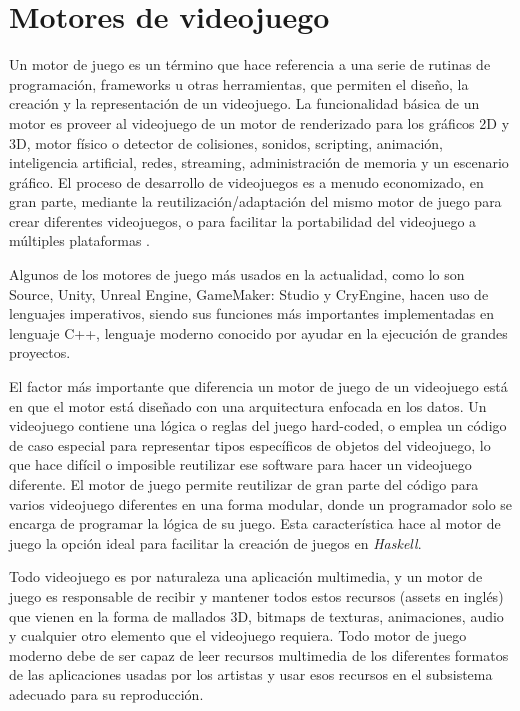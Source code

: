 
\section{Motores de videojuego}  %

\ifpdf
    \graphicspath{{motorJuego/Figs/Raster/}{motorJuego/Figs/PDF/}{motorJuego/Figs/}}
\else
    \graphicspath{{motorJuego/Figs/Vector/}{motorJuego/Figs/}}
\fi

Un motor de juego es un término que hace referencia a una serie de rutinas de programación, frameworks u otras herramientas, que permiten el diseño, la creación y la representación de un videojuego. La funcionalidad básica de un motor es proveer al videojuego de un motor de renderizado para los gráficos 2D y 3D, motor físico o detector de colisiones, sonidos, scripting, animación, inteligencia artificial, redes, streaming, administración de memoria y un escenario gráfico. El proceso de desarrollo de videojuegos es a menudo economizado, en gran parte, mediante la reutilización/adaptación del mismo motor de juego para crear diferentes videojuegos, o para facilitar la portabilidad del videojuego a múltiples plataformas \cite{JasonGregory-GameEngineArchitecture}.

Algunos de los motores de juego más usados en la actualidad, como lo son Source, Unity, Unreal Engine, GameMaker: Studio y CryEngine, hacen uso de lenguajes imperativos, siendo sus funciones más importantes implementadas en lenguaje C++, lenguaje moderno conocido por ayudar en la ejecución de grandes proyectos.

El factor más importante que diferencia un motor de juego de un videojuego está en que el motor está diseñado con una arquitectura enfocada en los datos. Un videojuego contiene una lógica o reglas del juego hard-coded, o emplea un código de caso especial para representar tipos específicos de objetos del videojuego, lo que hace difícil o imposible reutilizar ese software para hacer un videojuego diferente. El motor de juego permite reutilizar de gran parte del código para varios videojuego diferentes en una forma modular, donde un programador solo se encarga de programar la lógica de su juego. Esta característica hace al motor de juego la opción ideal para facilitar la creación de juegos en \emph{Haskell}.

Todo videojuego es por naturaleza una aplicación multimedia, y un motor de juego es responsable de recibir y mantener todos estos recursos (assets en inglés) que vienen en la forma de mallados 3D, bitmaps de texturas, animaciones, audio y cualquier otro elemento que el videojuego requiera. Todo motor de juego moderno debe de ser capaz de leer recursos multimedia de los diferentes formatos de las aplicaciones usadas por los artistas y usar esos recursos en el subsistema adecuado para su reproducción.

